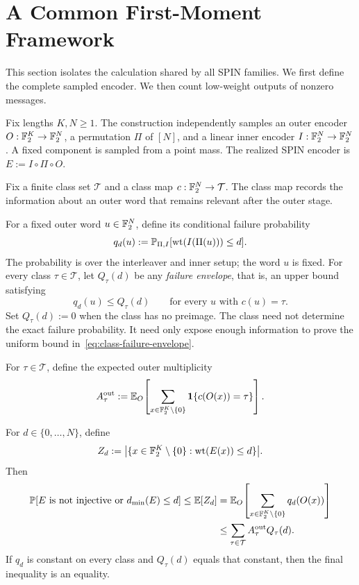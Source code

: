 \section{A Common First-Moment Framework}
\label{sec:framework}

This section isolates the calculation shared by all SPIN families. We first
define the complete sampled encoder. We then count low-weight outputs of
nonzero messages.

Fix lengths $K,N\ge1$. The construction independently samples an outer
encoder $O:\mathbb F_2^K\to\mathbb F_2^N$, a permutation $\Pi$ of $[N]$, and a linear
inner encoder $I:\mathbb F_2^N\to\mathbb F_2^N$. A fixed component is sampled from a
point mass. The realized SPIN encoder is $E:=I\circ\Pi\circ O$.

Fix a finite class set $\mathcal T$ and a class map
$c:\mathbb F_2^N\to\mathcal T$. The class map records the information about an
outer word that remains relevant after the outer stage.

For a fixed outer word $u\in\mathbb F_2^N$, define its conditional failure
probability
\begin{equation}
  q_d(u)
  :=
  \mathbb P_{\Pi,I}[\operatorname{wt}(I(\Pi(u)))\le d].
  \label{eq:conditional-inner-failure}
\end{equation}
The probability is over the interleaver and inner setup; the word $u$ is
fixed. For every class $\tau\in\mathcal T$, let $Q_\tau(d)$ be any
\emph{failure envelope}, that is, an upper bound satisfying
\begin{equation}
  q_d(u)\le Q_\tau(d)
  \qquad\text{for every $u$ with $c(u)=\tau$}.
  \label{eq:class-failure-envelope}
\end{equation}
Set $Q_\tau(d):=0$ when the class has no preimage. The class need not determine
the exact failure probability. It need only expose enough information to prove
the uniform bound in~\eqref{eq:class-failure-envelope}.

For $\tau\in\mathcal T$, define the expected outer multiplicity
\begin{equation}
  A_\tau^{\mathrm{out}}
  :=
  \mathbb E_O\!\left[
    \sum_{x\in\mathbb F_2^K\setminus\{0\}}
    \mathbf 1\{c(O(x))=\tau\}
  \right].
  \label{eq:outer-class-multiplicity}
\end{equation}

\begin{theorem}
\label{thm:class-first-moment}
For $d\in\{0,\ldots,N\}$, define
\[
  Z_d
  :=
  \bigl|\{x\in\mathbb F_2^K\setminus\{0\}:
  \operatorname{wt}(E(x))\le d\}\bigr|.
\]
Then
\begin{equation}
\begin{split}
  \mathbb P[E\text{ is not injective or }d_{\min}(E)\le d]
  \le
  \mathbb E[Z_d]
  &=
  \mathbb E_O\!\left[
    \sum_{x\in\mathbb F_2^K\setminus\{0\}}q_d(O(x))
  \right]\\
  &\le
  \sum_{\tau\in\mathcal T}
  A_\tau^{\mathrm{out}}Q_\tau(d).
\end{split}
  \label{eq:class-first-moment}
\end{equation}
If $q_d$ is constant on every class and $Q_\tau(d)$ equals that constant,
then the final inequality is an equality.
\end{theorem}

